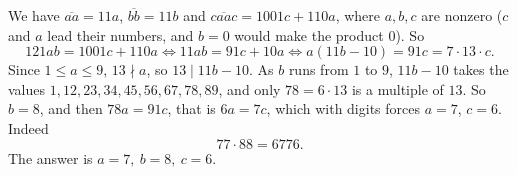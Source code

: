 We have $\overline{aa}=11a$, $\overline{bb}=11b$ and $\overline{caac}=1001c+110a$, where $a,b,c$ are nonzero ($c$ and $a$ lead their numbers, and $b=0$ would make the product $0$). So
\[
121ab=1001c+110a\iff 11ab=91c+10a\iff a(11b-10)=91c=7\cdot13\cdot c .
\]
Since $1\le a\le9$, $13\nmid a$, so $13\mid11b-10$. As $b$ runs from $1$ to $9$, $11b-10$ takes the values $1,12,23,34,45,56,67,78,89$, and only $78=6\cdot13$ is a multiple of $13$. So $b=8$, and then $78a=91c$, that is $6a=7c$, which with digits forces $a=7$, $c=6$. Indeed
\[
77\cdot88=6776 .
\]
The answer is $\boxed{a=7,\ b=8,\ c=6}$.
